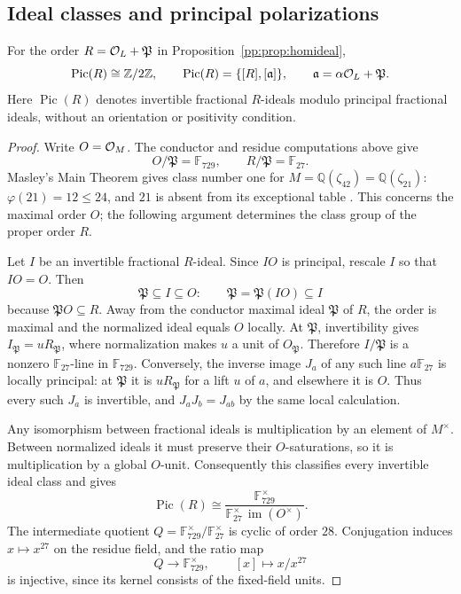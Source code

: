 \subsection{Ideal classes and principal polarizations}
\begin{proposition}
\label{pp:prop:picardorder}
For the order $R=\mathcal O_L+\mathfrak P$ in
Proposition~\ref{pp:prop:homideal},
\[
 \operatorname{Pic}(R)\cong\mathbb Z/2\mathbb Z,
 \qquad
 \operatorname{Pic}(R)=\{[R],[\mathfrak a]\},
 \qquad \mathfrak a=\alpha\mathcal O_L+\mathfrak P.
\]
Here $\operatorname{Pic}(R)$ denotes invertible fractional $R$-ideals
modulo principal fractional ideals, without an orientation or positivity
condition.
\end{proposition}
\begin{proof}
Write $O=\mathcal O_M$. The conductor and residue computations above give
\[
 O/\mathfrak P=\mathbb F_{729},\qquad
 R/\mathfrak P=\mathbb F_{27}.
\]
Masley's Main Theorem gives class number one for
$M=\mathbb Q(\zeta_{42})=\mathbb Q(\zeta_{21})$:
$\varphi(21)=12\le24$, and $21$ is absent from its exceptional table
\cite[p.~179]{Masley1976}. This concerns the maximal order $O$;
the following argument determines
the class group of the proper order $R$.

Let $I$ be an invertible fractional $R$-ideal. Since $IO$ is principal,
rescale $I$ so that $IO=O$. Then
\[
 \mathfrak P\subseteq I\subseteq O:
 \qquad \mathfrak P=\mathfrak P(IO)\subseteq I
\]
because $\mathfrak P O\subseteq R$.
Away from the conductor maximal ideal $\mathfrak P$ of $R$,
the order is maximal and the normalized ideal equals $O$ locally.
At $\mathfrak P$, invertibility gives
$I_{\mathfrak P}=uR_{\mathfrak P}$, where normalization makes
$u$ a unit of $O_{\mathfrak P}$. Therefore $I/\mathfrak P$ is a
nonzero $\mathbb F_{27}$-line in $\mathbb F_{729}$.
Conversely, the inverse image $J_a$ of any such line
$a\mathbb F_{27}$ is locally principal: at $\mathfrak P$ it is
$uR_{\mathfrak P}$ for a lift $u$ of $a$, and elsewhere it is $O$.
Thus every such $J_a$ is invertible, and
$J_aJ_b=J_{ab}$ by the same local calculation.

Any isomorphism between fractional ideals is multiplication by an
element of $M^\times$. Between normalized ideals it must preserve
their $O$-saturations, so it is multiplication by a global $O$-unit.
Consequently this classifies every invertible ideal class and gives
\[
 \operatorname{Pic}(R)\cong
 \frac{\mathbb F_{729}^{\times}}
 {\mathbb F_{27}^{\times}\,\operatorname{im}(O^{\times})}.
\]
The intermediate quotient
$Q=\mathbb F_{729}^{\times}/\mathbb F_{27}^{\times}$ is cyclic
of order $28$. Conjugation induces $x\mapsto x^{27}$ on the residue
field, and the ratio map
\[
 Q\longrightarrow\mathbb F_{729}^{\times},
 \qquad [x]\longmapsto x/x^{27}
\]
is injective, since its kernel consists of the fixed-field units.


\end{proof}
